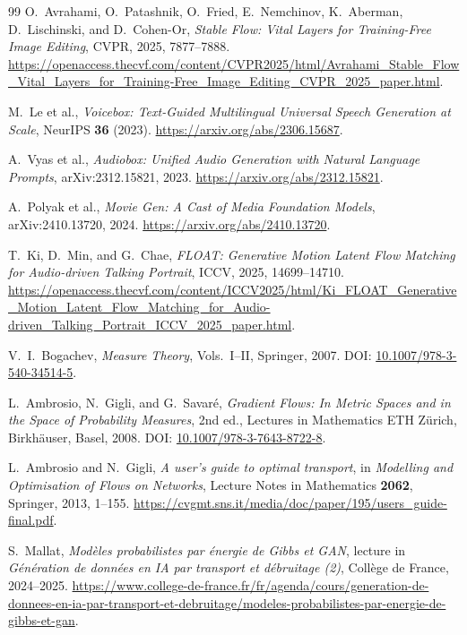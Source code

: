 \documentclass[11pt,reqno,a4paper]{amsart}
\theoremstyle{plain}
\theoremstyle{definition}
\theoremstyle{remark}
\begin{document}
\begin{thebibliography}{99}
O.~Avrahami, O.~Patashnik, O.~Fried, E.~Nemchinov, K.~Aberman,
D.~Lischinski, and D.~Cohen-Or,
\emph{Stable Flow: Vital Layers for Training-Free Image Editing},
CVPR, 2025, 7877--7888.
\url{https://openaccess.thecvf.com/content/CVPR2025/html/Avrahami_Stable_Flow_Vital_Layers_for_Training-Free_Image_Editing_CVPR_2025_paper.html}.

M.~Le et al.,
\emph{Voicebox: Text-Guided Multilingual Universal Speech Generation at Scale},
NeurIPS \textbf{36} (2023).
\url{https://arxiv.org/abs/2306.15687}.

A.~Vyas et al.,
\emph{Audiobox: Unified Audio Generation with Natural Language Prompts},
arXiv:2312.15821, 2023.
\url{https://arxiv.org/abs/2312.15821}.

A.~Polyak et al.,
\emph{Movie Gen: A Cast of Media Foundation Models},
arXiv:2410.13720, 2024.
\url{https://arxiv.org/abs/2410.13720}.

T.~Ki, D.~Min, and G.~Chae,
\emph{FLOAT: Generative Motion Latent Flow Matching for Audio-driven Talking Portrait},
ICCV, 2025, 14699--14710.
\url{https://openaccess.thecvf.com/content/ICCV2025/html/Ki_FLOAT_Generative_Motion_Latent_Flow_Matching_for_Audio-driven_Talking_Portrait_ICCV_2025_paper.html}.

V.~I.~Bogachev,
\emph{Measure Theory}, Vols.~I--II, Springer, 2007.
\newblock DOI: \href{https://doi.org/10.1007/978-3-540-34514-5}
{10.1007/978-3-540-34514-5}.

L.\ Ambrosio, N.\ Gigli, and G.\ Savar\'e,
\textit{Gradient Flows: In Metric Spaces and in the Space of Probability Measures},
2nd ed., Lectures in Mathematics ETH Z\"urich,
Birkh\"auser, Basel, 2008.
\newblock DOI: \href{https://doi.org/10.1007/978-3-7643-8722-8}
{10.1007/978-3-7643-8722-8}.

L.~Ambrosio and N.~Gigli,
\emph{A user's guide to optimal transport},
in \emph{Modelling and Optimisation of Flows on Networks},
Lecture Notes in Mathematics \textbf{2062}, Springer, 2013, 1--155.
\url{https://cvgmt.sns.it/media/doc/paper/195/users_guide-final.pdf}.

S.~Mallat,
\emph{Mod\`eles probabilistes par \texorpdfstring{\'energie}{energie} de Gibbs et GAN},
lecture in \emph{G\'en\'eration de donn\'ees en IA par transport et
 d\'ebruitage (2)}, Coll\`ege de France, 2024--2025.
\url{https://www.college-de-france.fr/fr/agenda/cours/generation-de-donnees-en-ia-par-transport-et-debruitage/modeles-probabilistes-par-energie-de-gibbs-et-gan}.


\end{thebibliography}
\end{document}
